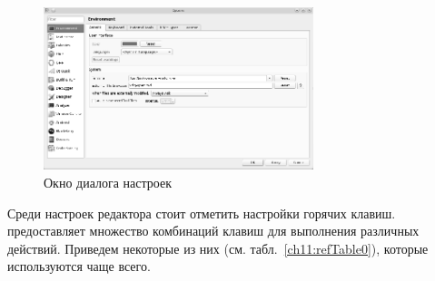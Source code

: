 \begin{figure}[htb]
\begin{center}
\includegraphics[width=0.7\textwidth]{img/ris_11_2}
\caption[Окно диалога настроек ]{Окно диалога настроек }
\label{ch11:refDrawing1}
\end{center}
\end{figure}

Среди настроек редактора стоит отметить настройки горячих клавиш. 
 предоставляет множество комбинаций клавиш для выполнения различных действий. 
Приведем некоторые из них (см. табл.~\ref{ch11:refTable0}), которые
используются чаще всего.

